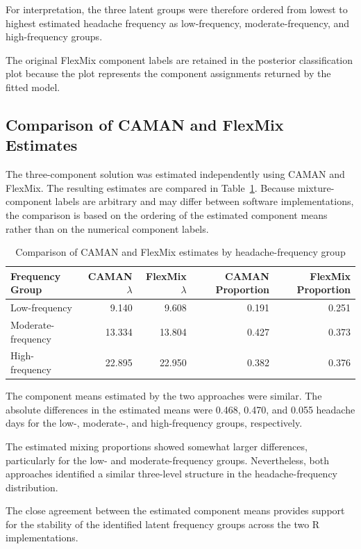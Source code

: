 For interpretation, the three latent groups were therefore ordered
from lowest to highest estimated headache frequency as
low-frequency, moderate-frequency, and high-frequency groups.

The original FlexMix component labels are retained in the posterior
classification plot because the plot represents the component
assignments returned by the fitted model.

\subsection{Comparison of CAMAN and FlexMix Estimates}

The three-component solution was estimated independently using CAMAN
and FlexMix. The resulting estimates are compared in
Table~\ref{tab:camanflexmix}. Because mixture-component labels are
arbitrary and may differ between software implementations, the
comparison is based on the ordering of the estimated component means
rather than on the numerical component labels.

\begin{table}[H]
\centering
\caption{Comparison of CAMAN and FlexMix estimates by headache-frequency group}
\label{tab:camanflexmix}
\begin{tabular}{lrrrr}
\toprule
Frequency Group &
CAMAN $\lambda$ &
FlexMix $\lambda$ &
CAMAN Proportion &
FlexMix Proportion \\
\midrule
Low-frequency & 9.140 & 9.608 & 0.191 & 0.251 \\
Moderate-frequency & 13.334 & 13.804 & 0.427 & 0.373 \\
High-frequency & 22.895 & 22.950 & 0.382 & 0.376 \\
\bottomrule
\end{tabular}
\end{table}

The component means estimated by the two approaches were similar.
The absolute differences in the estimated means were 0.468, 0.470,
and 0.055 headache days for the low-, moderate-, and high-frequency
groups, respectively.

The estimated mixing proportions showed somewhat larger differences,
particularly for the low- and moderate-frequency groups. Nevertheless,
both approaches identified a similar three-level structure in the
headache-frequency distribution.

The close agreement between the estimated component means provides
support for the stability of the identified latent frequency groups
across the two R implementations.

